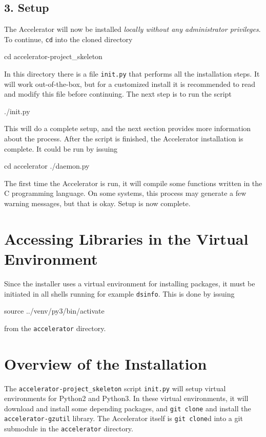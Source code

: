 \documentclass[a4paper]{article}
\begin{document}
\subsection*{3. Setup}
The Accelerator will now be installed \textsl{locally without any
  administrator privileges}.  To continue, \texttt{cd} into the cloned
directory
\begin{shell}
cd accelerator-project_skeleton
\end{shell}
In this directory there is a file \texttt{init.py} that performs all
the installation steps.  It will work out-of-the-box, but for a
customized install it is recommended to read and modify this file
before continuing.  The next step is to run the script
\begin{shell}
./init.py
\end{shell}
This will do a complete setup, and the next section provides more
information about the process.  After the script is finished, the
Accelerator installation is complete.  It could be run by issuing
\begin{shell}
cd accelerator
./daemon.py  
\end{shell}
The first time the Accelerator is run, it will compile some functions
written in the C programming language.  On some systems, this process
may generate a few warning messages, but that is okay.  Setup is now
complete.

\section*{Accessing Libraries in the Virtual Environment}
Since the installer uses a virtual environment for installing
packages, it must be initiated in all shells running for example
\texttt{dsinfo}.  This is done by issuing
\begin{shell}
source ../venv/py3/bin/activate
\end{shell}
from the \texttt{accelerator} directory.



\section*{Overview of the Installation}
The \texttt{accelerator-project\_skeleton} script \texttt{init.py}
will setup virtual environments for Python2 and Python3.  In these
virtual environments, it will download and install some depending
packages, and \texttt{git clone} and install the
\texttt{accelerator-gzutil} library.  The Accelerator itself is
\texttt{git clone}d into a git submodule in the \texttt{accelerator}
directory.
\end{document}
